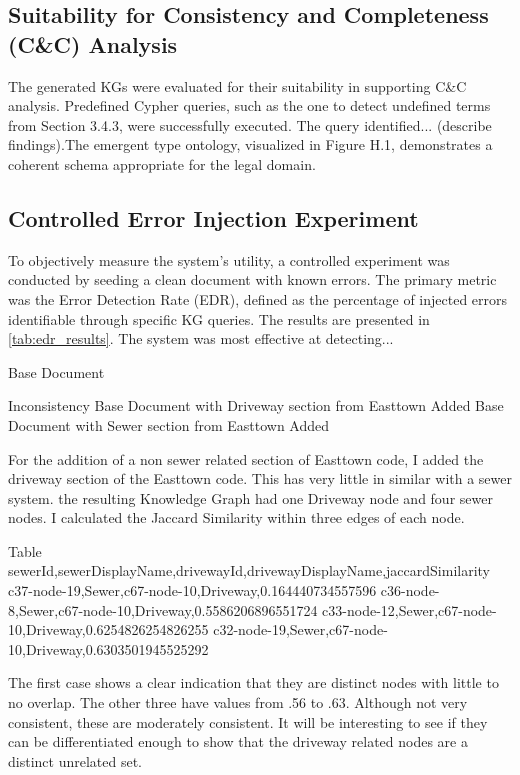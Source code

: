 \subsection{Suitability for Consistency and Completeness (C\&C) Analysis}
\label{subsec:candc_suitability}
The generated KGs were evaluated for their suitability in supporting C\&C analysis. Predefined Cypher queries, such as the one to detect undefined terms from Section 3.4.3, were successfully executed. The query identified... (describe findings).The emergent type ontology, visualized in Figure H.1, demonstrates a coherent schema appropriate for the legal domain.

\subsection{Controlled Error Injection Experiment}
\label{subsec:error_injection}
To objectively measure the system's utility, a controlled experiment was conducted by seeding a clean document with known errors. The primary metric was the Error Detection Rate (EDR), defined as the percentage of injected errors identifiable through specific KG queries. The results are presented in \cref{tab:edr_results}. The system was most effective at detecting...

Base Document

Inconsistency
Base Document with Driveway section from Easttown Added
Base Document with Sewer section from Easttown Added

For the addition of a non sewer related section of Easttown code, I added the driveway section of the Easttown code. This has very little in similar with a sewer system. the resulting Knowledge Graph had one Driveway node and four sewer nodes. I calculated the Jaccard Similarity within three edges of each node.

Table
sewerId,sewerDisplayName,drivewayId,drivewayDisplayName,jaccardSimilarity
c37-node-19,Sewer,c67-node-10,Driveway,0.164440734557596
c36-node-8,Sewer,c67-node-10,Driveway,0.5586206896551724
c33-node-12,Sewer,c67-node-10,Driveway,0.6254826254826255
c32-node-19,Sewer,c67-node-10,Driveway,0.6303501945525292

The first case shows a clear indication that they are distinct nodes with little to no overlap. The other three have values from .56 to .63. Although not very consistent, these are moderately consistent. It will be interesting to see if they can be differentiated enough to show that the driveway related nodes are a distinct unrelated set.


